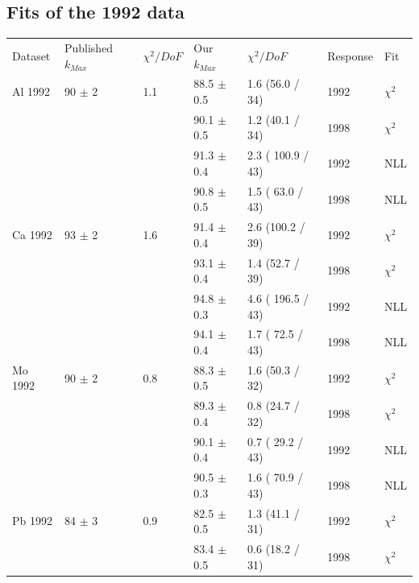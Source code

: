 \subsection { Fits of the 1992 data }
\begin{table}[h]
  \begin{center}
    \begin{tabular}{|l||l|l|l|l|l|l|}
      \hline
      Dataset & Published $k_{Max}$ & $\chi^2 / DoF$ & Our $k_{Max}$ & $\chi^2 / DoF$  & Response & Fit \\
      \hhline{|=||=|=|=|=|=|=|}
       Al 1992   & 90   $\pm$ 2   & 1.1 & 88.5 $\pm$ 0.5 &  1.6 (56.0 / 34) & 1992 & $\chi^2$ \\  
                 &                &     & 90.1 $\pm$ 0.5 &  1.2 (40.1 / 34) & 1998 & $\chi^2$ \\  
                                                                             
                 &                &     & 91.3 $\pm$ 0.4 & 2.3 ( 100.9 / 43)& 1992 & NLL \\
                 &                &     & 90.8 $\pm$ 0.5 & 1.5 ( 63.0 / 43) & 1998 & NLL \\
       \hline                                                                
       Ca 1992   & 93   $\pm$ 2   & 1.6 & 91.4 $\pm$ 0.4 &  2.6 (100.2 / 39)& 1992 & $\chi^2$ \\  
                 &                &     & 93.1 $\pm$ 0.4 &  1.4 (52.7 / 39) & 1998 & $\chi^2$ \\  
                                                                             
                 &                &     & 94.8 $\pm$ 0.3 & 4.6 ( 196.5 / 43)& 1992 & NLL \\
                 &                &     & 94.1 $\pm$ 0.4 & 1.7 ( 72.5 / 43) & 1998 & NLL \\
      \hline                                                                 
       Mo 1992   & 90   $\pm$ 2   & 0.8 & 88.3 $\pm$ 0.5 &  1.6 (50.3 / 32) & 1992 & $\chi^2$ \\  
                 &                &     & 89.3 $\pm$ 0.4 &  0.8 (24.7 / 32) & 1998 & $\chi^2$ \\  
                                                                             
                 &                &     & 90.1 $\pm$ 0.4 & 0.7 ( 29.2 / 43) & 1992 & NLL \\
                 &                &     & 90.5 $\pm$ 0.3 & 1.6 ( 70.9 / 43) & 1998 & NLL \\
      \hline                                                                 
       Pb 1992   & 84   $\pm$ 3   & 0.9 & 82.5 $\pm$ 0.5 &  1.3 (41.1 / 31) & 1992 & $\chi^2$ \\  
                 &                &     & 83.4 $\pm$ 0.5 &  0.6 (18.2 / 31) & 1998 & $\chi^2$ \\  
                                                                             

\end{tabular}
\end{center}
\end{table}
